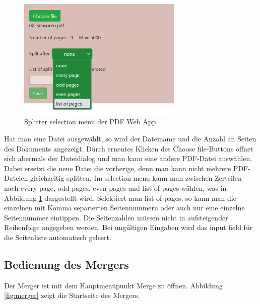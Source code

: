 \begin{figure}[!htbp]
	\centering
	\includegraphics[width=0.7\textwidth]{"images/splitter2.png"}
	\caption{Splitter selection menu der PDF Web App}
	\label{fig:splitter2}
\end{figure}

Hat man eine Datei ausgewählt, so wird der Dateiname und die Anzahl an Seiten des Dokuments angezeigt. Durch erneutes Klicken des Choose file-Buttons öffnet sich abermals der Dateidialog und man kann eine andere PDF-Datei auswählen. Dabei ersetzt die neue Datei die vorherige, denn man kann nicht mehrere PDF-Dateien gleichzeitig splitten. Im selection menu kann man zwischen Zerteilen nach every page, odd pages, even pages und list of pages wählen, was in Abbildung \ref{fig:splitter2} dargestellt wird. Selektiert man list of pages, so kann man die einzelnen mit Komma separierten Seitennummern oder auch nur eine einzelne Seitennummer eintippen. Die Seitenzahlen müssen nicht in aufsteigender Reihenfolge angegeben werden. Bei ungültigen Eingaben wird das input field für die Seitenliste automatisch geleert. 

\subsection{Bedienung des Mergers}
Der Merger ist mit dem Hauptmenüpunkt Merge zu öffnen. Abbildung \ref{fig:merger} zeigt die Startseite des Mergers. 

